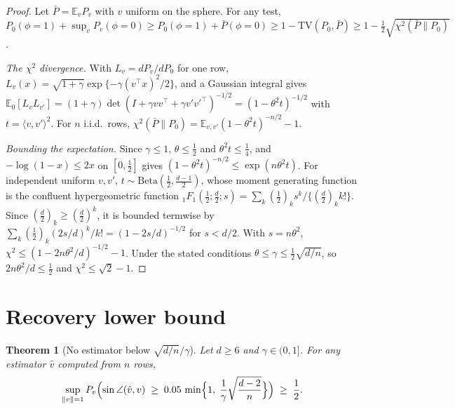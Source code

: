 \documentclass[11pt]{article}
\newtheorem{theorem}{Theorem}
\begin{document}
\begin{proof}
Let $\bar P=\mathbb{E}_vP_v$ with $v$ uniform on the sphere. For any test, $P_0(\phi=1)+\sup_vP_v(\phi=0)\ge P_0(\phi=1)+\bar P(\phi=0)\ge1-\mathrm{TV}(P_0,\bar P)\ge1-\tfrac12\sqrt{\chi^2(\bar P\|P_0)}$.

\emph{The $\chi^2$ divergence.} With $L_v=dP_v/dP_0$ for one row, $L_v(x)=\sqrt{1+\gamma}\exp\{-\gamma(v^\top x)^2/2\}$, and a Gaussian integral gives
$\mathbb{E}_0[L_vL_{v'}]=(1+\gamma)\det(I+\gamma vv^\top+\gamma v'v'^\top)^{-1/2}=(1-\theta^2t)^{-1/2}$ with $t=\langle v,v'\rangle^2$. For $n$ i.i.d.\ rows, $\chi^2(\bar P\|P_0)=\mathbb{E}_{v,v'}(1-\theta^2t)^{-n/2}-1$.

\emph{Bounding the expectation.} Since $\gamma\le1$, $\theta\le\tfrac12$ and $\theta^2t\le\tfrac14$, and $-\log(1-x)\le2x$ on $[0,\tfrac12]$ gives $(1-\theta^2t)^{-n/2}\le\exp(n\theta^2t)$. For independent uniform $v,v'$, $t\sim\mathrm{Beta}(\tfrac12,\tfrac{d-1}2)$, whose moment generating function is the confluent hypergeometric function ${}_1F_1(\tfrac12;\tfrac d2;s)=\sum_k(\tfrac12)_ks^k/\{(\tfrac d2)_kk!\}$. Since $(\tfrac d2)_k\ge(\tfrac d2)^k$, it is bounded termwise by $\sum_k(\tfrac12)_k(2s/d)^k/k!=(1-2s/d)^{-1/2}$ for $s<d/2$. With $s=n\theta^2$, $\chi^2\le(1-2n\theta^2/d)^{-1/2}-1$. Under the stated conditions $\theta\le\gamma\le\tfrac12\sqrt{d/n}$, so $2n\theta^2/d\le\tfrac12$ and $\chi^2\le\sqrt2-1$.
\end{proof}

\section{Recovery lower bound}

\begin{theorem}[No estimator below $\sqrt{d/n}/\gamma$]
\label{thm:rec}
Let $d\ge6$ and $\gamma\in(0,1]$. For any estimator $\hat v$ computed from $n$ rows,
\[
  \sup_{\|v\|=1}P_v\Bigl(\sin\angle(\hat v,v)\;\ge\;0.05\,\min\Bigl\{1,\;\frac1\gamma\sqrt{\frac{d-2}{n}}\Bigr\}\Bigr)\;\ge\;\frac12 .
\]
\end{theorem}
\end{document}
